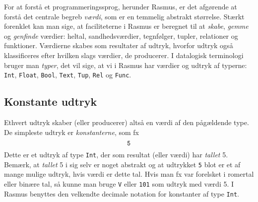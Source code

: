 For at forst\aa{} et 
programmeringssprog, herunder {\sc Rasmus}, er det 
afg\o{}rende at forst\aa{}
det centrale begreb {\em v\ae{}rdi}, som er en temmelig abstrakt
st\o{}rrelse. St\ae{}rkt forenklet kan man sige, at faciliteterne i
{\sc Rasmus} er beregnet til at {\em skabe}, {\em gemme\/}
og {\em genfinde\/} v\ae{}rdier: heltal, sandhedsv\ae{}rdier,
tegnf\o{}lger, tupler, relationer og funktioner.
V\ae{}rdierne skabes som resultater af udtryk, hvorfor udtryk ogs\aa{}
klassificeres efter hvilken slags v\ae{}rdier, de producerer.
I datalogisk terminologi bruger man {\em typer}, det vil sige,
at vi i {\sc Rasmus} har v\ae{}rdier og udtryk af typerne:
\verb"Int", \verb"Float", \verb"Bool", \verb"Text", \verb"Tup", \verb"Rel" og \verb"Func".

\subsection{Konstante udtryk}
Ethvert udtryk skaber (eller producerer) alts\aa{} en v\ae{}rdi af den
p\aa{}g\ae{}ldende type. De simpleste udtryk er {\em konstanterne},
som fx
$$\mbox{\tt 5}$$
Dette er et udtryk af type \verb"Int", der som resultat (eller v\ae{}rdi)
har {\em tallet\/} 5. Bem\ae{}rk, at {\em tallet\/} 5 i sig selv er noget
abstrakt og at udtrykket {\tt 5} blot er et af mange mulige udtryk, hvis
v\ae{}rdi er dette tal. Hvis man fx var forelsket i romertal eller
bin\ae{}re tal, s\aa{} kunne man bruge \verb"V" eller \verb"101" som
udtryk med v\ae{}rdi 5. I {\sc Rasmus} benyttes den velkendte decimale
notation for konstanter af type \verb"Int".

